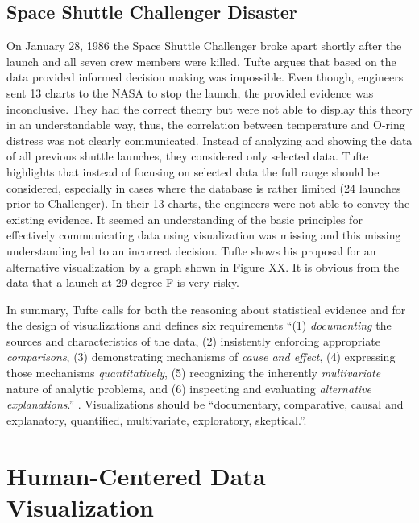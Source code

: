 \documentclass[
]{book}
\begin{document}
\hypertarget{space-shuttle-challenger-disaster}{%
\subsection{Space Shuttle Challenger Disaster}\label{space-shuttle-challenger-disaster}}

On January 28, 1986 the Space Shuttle Challenger broke apart shortly after the launch and all seven crew members were killed. Tufte \citep{tufte1997visualexplanation} argues that based on the data provided informed decision making was impossible. Even though, engineers sent 13 charts to the NASA to stop the launch, the provided evidence was inconclusive. They had the correct theory but were not able to display this theory in an understandable way, thus, the correlation between temperature and O-ring distress was not clearly communicated. Instead of analyzing and showing the data of all previous shuttle launches, they considered only selected data. Tufte highlights that instead of focusing on selected data the full range should be considered, especially in cases where the database is rather limited (24 launches prior to Challenger). In their 13 charts, the engineers were not able to convey the existing evidence. It seemed an understanding of the basic principles for effectively communicating data using visualization was missing and this missing understanding led to an incorrect decision. Tufte shows his proposal for an alternative visualization by a graph shown in Figure XX. It is obvious from the data that a launch at 29 degree F is very risky.

In summary, Tufte calls for both the reasoning about statistical evidence and for the design of visualizations and defines six requirements ``(1) \emph{documenting} the sources and characteristics of the data, (2) insistently enforcing appropriate \emph{comparisons}, (3) demonstrating mechanisms of \emph{cause and effect}, (4) expressing those mechanisms \emph{quantitatively}, (5) recognizing the inherently \emph{multivariate} nature of analytic problems, and (6) inspecting and evaluating \emph{alternative explanations}.'' \citep{tufte1997visualexplanation}. Visualizations should be ``documentary, comparative, causal and explanatory, quantified, multivariate, exploratory, skeptical.''\citep{tufte1997visualexplanation}.

\hypertarget{sec:hcd}{%
\section{Human-Centered Data Visualization}\label{sec:hcd}}
\end{document}
